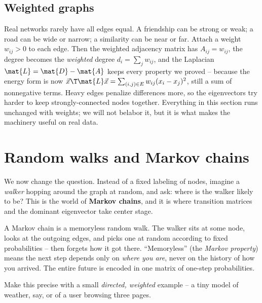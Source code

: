\subsection{Weighted graphs}

Real networks rarely have all edges equal. A friendship can be strong or weak; a road can
be wide or narrow; a similarity can be near or far. Attach a weight $w_{ij} > 0$ to each
edge. Then the weighted adjacency matrix has $A_{ij} = w_{ij}$, the degree becomes the
\emph{weighted} degree $d_i = \sum_j w_{ij}$, and the Laplacian $\mat{L} = \mat{D}-\mat{A}$
keeps every property we proved -- because the energy form is now
$\vec{x}\T\mat{L}\vec{x} = \sum_{(i,j)\in E} w_{ij}(x_i - x_j)^2$, still a sum of
nonnegative terms. Heavy edges penalize differences more, so the eigenvectors try harder to
keep strongly-connected nodes together. Everything in this section runs unchanged with
weights; we will not belabor it, but it is what makes the machinery useful on real data.

\section{Random walks and Markov chains}
\label{ch35:markov}

We now change the question. Instead of a fixed labeling of nodes, imagine a \emph{walker}
hopping around the graph at random, and ask: where is the walker likely to be? This is the
world of \textbf{Markov chains}, and it is where transition matrices and the dominant
eigenvector take center stage.

\begin{intuitionbox}
A Markov chain is a memoryless random walk. The walker sits at some node, looks at the
outgoing edges, and picks one at random according to fixed probabilities -- then forgets
how it got there. ``Memoryless'' (the \emph{Markov property}) means the next step depends
only on \emph{where you are}, never on the history of how you arrived. The entire future is
encoded in one matrix of one-step probabilities.
\end{intuitionbox}

Make this precise with a small \emph{directed, weighted} example -- a tiny model of weather,
say, or of a user browsing three pages.

